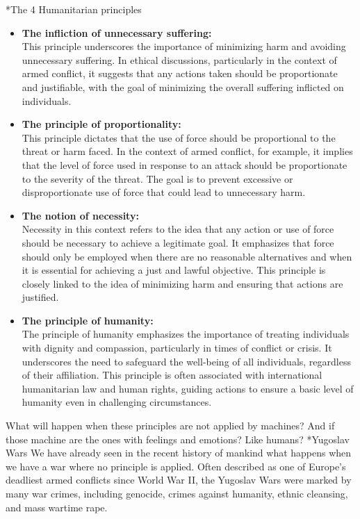 \documentclass[twocolumn, a4paper,10pt]{article}
\makeatletter
\renewcommand\section{\@startsection{section}{1}{\z@}{3pt}{3pt}{\normalfont\large\bfseries}}
\makeatother
\begin{document}
\section*{The 4 Humanitarian principles}
\begin{itemize}
\item \textbf{The infliction of unnecessary suffering:} \\ This principle underscores the importance of minimizing harm and avoiding unnecessary suffering. In ethical discussions, particularly in the context of armed conflict, it suggests that any actions taken should be proportionate and justifiable, with the goal of minimizing the overall suffering inflicted on individuals.
\item \textbf{The principle of proportionality:} \\ This principle dictates that the use of force should be proportional to the threat or harm faced. In the context of armed conflict, for example, it implies that the level of force used in response to an attack should be proportionate to the severity of the threat. The goal is to prevent excessive or disproportionate use of force that could lead to unnecessary harm.
\item \textbf{The notion of necessity:}\\Necessity in this context refers to the idea that any action or use of force should be necessary to achieve a legitimate goal. It emphasizes that force should only be employed when there are no reasonable alternatives and when it is essential for achieving a just and lawful objective. This principle is closely linked to the idea of minimizing harm and ensuring that actions are justified.
\item \textbf{The principle of humanity:}\\The principle of humanity emphasizes the importance of treating individuals with dignity and compassion, particularly in times of conflict or crisis. It underscores the need to safeguard the well-being of all individuals, regardless of their affiliation. This principle is often associated with international humanitarian law and human rights, guiding actions to ensure a basic level of humanity even in challenging circumstances.
\end{itemize}

What will happen when these principles are not applied by machines? And if those machine are the ones with feelings and emotions? Like humans?
\section*{Yugoslav Wars}
We have already seen in the recent history of mankind what happens when we have a war where no principle is applied.
Often described as one of Europe's deadliest armed conflicts since World War II, the Yugoslav Wars were marked by many war crimes, including genocide, crimes against humanity, ethnic cleansing, and mass wartime rape. 
\end{document}
